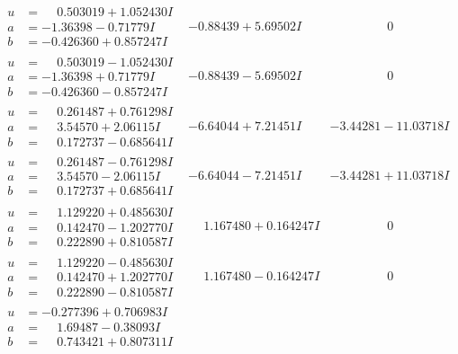 \documentclass[1p]{elsarticle_modified}
\theoremstyle{definition}
\begin{document}
$$\begin{array}{c|c|c}
\begin{aligned}
u &= \phantom{-}0.503019 + 1.052430 I \\
a &= -1.36398 - 0.71779 I \\
b &= -0.426360 + 0.857247 I\end{aligned}
 & -0.88439 + 5.69502 I & \phantom{-0.000000 } 0 \\ \hline\begin{aligned}
u &= \phantom{-}0.503019 - 1.052430 I \\
a &= -1.36398 + 0.71779 I \\
b &= -0.426360 - 0.857247 I\end{aligned}
 & -0.88439 - 5.69502 I & \phantom{-0.000000 } 0 \\ \hline\begin{aligned}
u &= \phantom{-}0.261487 + 0.761298 I \\
a &= \phantom{-}3.54570 + 2.06115 I \\
b &= \phantom{-}0.172737 - 0.685641 I\end{aligned}
 & -6.64044 + 7.21451 I & -3.44281 - 11.03718 I \\ \hline\begin{aligned}
u &= \phantom{-}0.261487 - 0.761298 I \\
a &= \phantom{-}3.54570 - 2.06115 I \\
b &= \phantom{-}0.172737 + 0.685641 I\end{aligned}
 & -6.64044 - 7.21451 I & -3.44281 + 11.03718 I \\ \hline\begin{aligned}
u &= \phantom{-}1.129220 + 0.485630 I \\
a &= \phantom{-}0.142470 - 1.202770 I \\
b &= \phantom{-}0.222890 + 0.810587 I\end{aligned}
 & \phantom{-}1.167480 + 0.164247 I & \phantom{-0.000000 } 0 \\ \hline\begin{aligned}
u &= \phantom{-}1.129220 - 0.485630 I \\
a &= \phantom{-}0.142470 + 1.202770 I \\
b &= \phantom{-}0.222890 - 0.810587 I\end{aligned}
 & \phantom{-}1.167480 - 0.164247 I & \phantom{-0.000000 } 0 \\ \hline\begin{aligned}
u &= -0.277396 + 0.706983 I \\
a &= \phantom{-}1.69487 - 0.38093 I \\
b &= \phantom{-}0.743421 + 0.807311 I\end{aligned}

\end{array}$$
\end{document}
